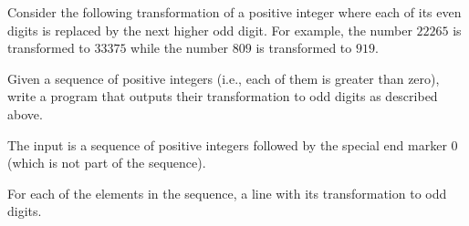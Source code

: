 
\Statement

Consider the following transformation of a positive integer where each of its even digits is replaced by the next higher odd digit. For example, the number $22265$ is transformed to $33375$ while the number $809$ is transformed to $919$.

Given a sequence of positive integers (i.e., each of them is greater than zero), write a program that outputs their transformation to odd digits as described above.

\Input

The input is a sequence of positive integers followed by the special end marker $0$ (which is not part of the sequence).

\Output

For each of the elements in the sequence, a line with its transformation to odd digits.

\Sample
